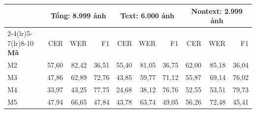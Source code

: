 \begin{tabular*}{\linewidth}{@{\extracolsep{\fill}}lrrrrrrrrr@{}}
\toprule
& \multicolumn{3}{c}{\textbf{Tổng: 8.999 ảnh}} &
\multicolumn{3}{c}{\textbf{Text: 6.000 ảnh}} &
\multicolumn{3}{c}{\textbf{Nontext: 2.999 ảnh}} \\
\cmidrule(lr){2-4}\cmidrule(lr){5-7}\cmidrule(lr){8-10}
\textbf{Mã} & CER & WER & F1 & CER & WER & F1 & CER & WER & F1 \\
\midrule
M2 & 57,60 & 82,42 & 36,51 & 55,40 & 81,05 & 36,75 & 62,00 & 85,18 & 36,04 \\
M3 & 47,86 & 62,89 & 72,76 & 43,85 & 59,77 & 71,12 & 55,87 & 69,14 & 76,02 \\
M4 & 33,97 & 43,25 & 77,75 & 24,68 & 38,12 & 76,76 & 52,55 & 53,51 & 79,73 \\
M5 & 47,94 & 66,65 & 47,84 & 43,78 & 63,74 & 49,05 & 56,26 & 72,48 & 45,41 \\
\bottomrule
\end{tabular*}
